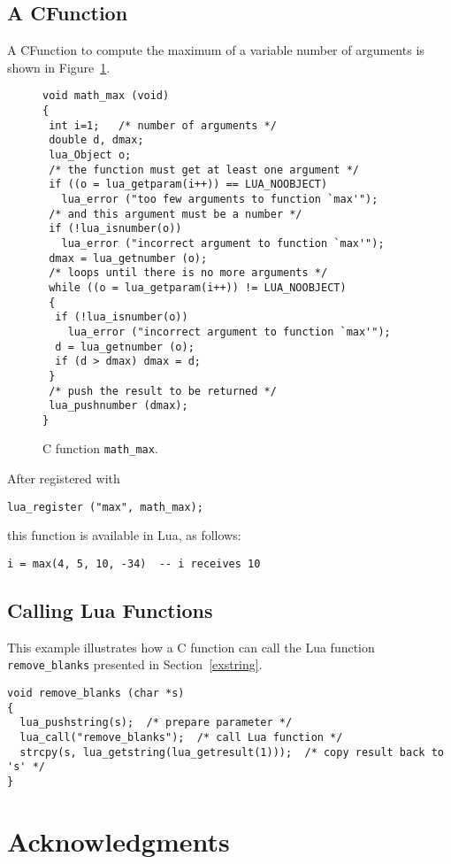 \subsection{A CFunction} \label{exCFunction}
A CFunction to compute the maximum of a variable number of arguments
is shown in Figure~\ref{Cmax}.
\begin{figure}
\Line
\begin{verbatim}
void math_max (void)
{
 int i=1;   /* number of arguments */
 double d, dmax;
 lua_Object o;
 /* the function must get at least one argument */
 if ((o = lua_getparam(i++)) == LUA_NOOBJECT)
   lua_error ("too few arguments to function `max'");
 /* and this argument must be a number */
 if (!lua_isnumber(o))
   lua_error ("incorrect argument to function `max'");
 dmax = lua_getnumber (o);
 /* loops until there is no more arguments */
 while ((o = lua_getparam(i++)) != LUA_NOOBJECT)
 {
  if (!lua_isnumber(o))
    lua_error ("incorrect argument to function `max'");
  d = lua_getnumber (o);
  if (d > dmax) dmax = d;
 }
 /* push the result to be returned */
 lua_pushnumber (dmax);
}
\end{verbatim}
\caption{C function {\tt math\_max}.\label{Cmax}}
\Line
\end{figure}
After registered with
\begin{verbatim}
lua_register ("max", math_max);
\end{verbatim}
this function is available in Lua, as follows:
\begin{verbatim}
i = max(4, 5, 10, -34)  -- i receives 10
\end{verbatim}


\subsection{Calling Lua Functions} \label{exLuacall}

This example illustrates how a C function can call the Lua function
\verb'remove_blanks' presented in Section~\ref{exstring}.
\begin{verbatim}
void remove_blanks (char *s)
{
  lua_pushstring(s);  /* prepare parameter */
  lua_call("remove_blanks");  /* call Lua function */
  strcpy(s, lua_getstring(lua_getresult(1)));  /* copy result back to 's' */
}
\end{verbatim}


\section*{Acknowledgments}

